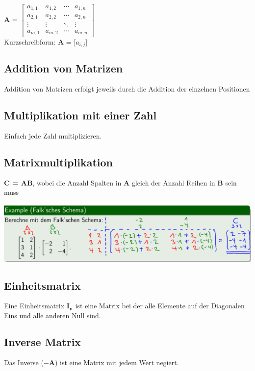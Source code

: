\documentclass[12pt]{scrartcl}
\begin{document}
\renewcommand{\arraystretch}{1}
\textbf{A} = 
$
\begin{bmatrix}
    a_{1,1} & a_{1,2} & \cdots & a_{1,n}\\
    a_{2,1} & a_{2,2} & \cdots & a_{2,n}\\
    \vdots & \vdots & \ddots & \vdots\\
    a_{m,1} & a_{m,2} & \cdots & a_{m,n}
\end{bmatrix}$\\


Kurzschreibform: \textbf{A} = [$a_{i,j}$]\\


\subsection{Addition von Matrizen}

Addition von Matrizen erfolgt jeweils durch die Addition der einzelnen Positionen


\subsection{Multiplikation mit einer Zahl}
Einfach jede Zahl multiplizieren.


\subsection{Matrixmultiplikation}
\textbf{C = AB}, wobei die Anzahl Spalten in \textbf{A} gleich der Anzahl Reihen in \textbf{B}
sein muss

\includegraphics[width=15cm]{img/matrizenmultiplikation.png}


\subsection{Einheitsmatrix}
Eine Einheitsmatrix $\mathbf{I_n}$ ist eine Matrix bei der alle Elemente auf
der Diagonalen Eins und alle anderen Null sind.\\


\subsection{Inverse Matrix}
Das Inverse ($\mathbf{-A}$) ist eine Matrix mit jedem Wert negiert.\\
\end{document}
